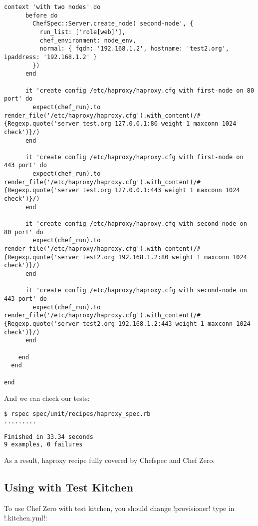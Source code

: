 \begin{lstlisting}[label=lst:testing-chef-zero15]
    context 'with two nodes' do
      before do
        ChefSpec::Server.create_node('second-node', {
          run_list: ['role[web]'],
          chef_environment: node_env,
          normal: { fqdn: '192.168.1.2', hostname: 'test2.org', ipaddress: '192.168.1.2' }
        })
      end

      it 'create config /etc/haproxy/haproxy.cfg with first-node on 80 port' do
        expect(chef_run).to render_file('/etc/haproxy/haproxy.cfg').with_content(/#{Regexp.quote('server test.org 127.0.0.1:80 weight 1 maxconn 1024 check')}/)
      end

      it 'create config /etc/haproxy/haproxy.cfg with first-node on 443 port' do
        expect(chef_run).to render_file('/etc/haproxy/haproxy.cfg').with_content(/#{Regexp.quote('server test.org 127.0.0.1:443 weight 1 maxconn 1024 check')}/)
      end

      it 'create config /etc/haproxy/haproxy.cfg with second-node on 80 port' do
        expect(chef_run).to render_file('/etc/haproxy/haproxy.cfg').with_content(/#{Regexp.quote('server test2.org 192.168.1.2:80 weight 1 maxconn 1024 check')}/)
      end

      it 'create config /etc/haproxy/haproxy.cfg with second-node on 443 port' do
        expect(chef_run).to render_file('/etc/haproxy/haproxy.cfg').with_content(/#{Regexp.quote('server test2.org 192.168.1.2:443 weight 1 maxconn 1024 check')}/)
      end

    end
  end

end
\end{lstlisting}

And we can check our tests:

\begin{lstlisting}[language=Bash,label=lst:testing-chef-zero16]
$ rspec spec/unit/recipes/haproxy_spec.rb
.........

Finished in 33.34 seconds
9 examples, 0 failures
\end{lstlisting}

As a result, haproxy recipe fully covered by Chefspec and Chef Zero.

\subsection{Using with Test Kitchen}

To use Chef Zero with test kitchen, you should change \inline!provisioner! type in \inline!.kitchen.yml!:

